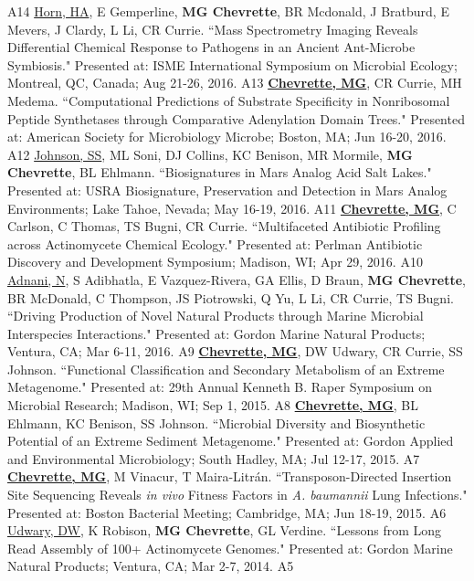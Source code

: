 \begin{cvpubs}
    {A14} %
  \cvpub
    {\underline{Horn, HA}, E Gemperline, \textbf{MG Chevrette}, BR Mcdonald, J Bratburd, E Mevers, J Clardy, L Li, CR Currie. ``Mass Spectrometry Imaging Reveals Differential Chemical Response to Pathogens in an Ancient Ant-Microbe Symbiosis." Presented at: ISME International Symposium on Microbial Ecology; Montreal, QC, Canada; Aug 21-26, 2016.} %
    {A13} %
  \cvpub
    {\textbf{\underline{Chevrette, MG}}, CR Currie, MH Medema.  ``Computational Predictions of Substrate Specificity in Nonribosomal Peptide Synthetases through Comparative Adenylation Domain Trees." Presented at: American Society for Microbiology Microbe; Boston, MA; Jun 16-20, 2016.} %
    {A12} %
  \cvpub
    {\underline{Johnson, SS}, ML Soni, DJ Collins, KC Benison, MR Mormile, \textbf{MG Chevrette}, BL Ehlmann. ``Biosignatures in Mars Analog Acid Salt Lakes." Presented at: USRA Biosignature, Preservation and Detection in Mars Analog Environments; Lake Tahoe, Nevada; May 16-19, 2016.} %
    {A11} %
  \cvpub
    {\textbf{\underline{Chevrette, MG}}, C Carlson, C Thomas, TS Bugni, CR Currie. ``Multifaceted Antibiotic Profiling across Actinomycete Chemical Ecology." Presented at: Perlman Antibiotic Discovery and Development Symposium; Madison, WI; Apr 29, 2016.} %
    {A10} %
  \cvpub
    {\underline{Adnani, N}, S Adibhatla, E Vazquez-Rivera, GA Ellis, D Braun, \textbf{MG Chevrette}, BR McDonald, C Thompson, JS Piotrowski, Q Yu, L Li, CR Currie, TS Bugni. ``Driving Production of Novel Natural Products through Marine Microbial Interspecies Interactions." Presented at: Gordon Marine Natural Products; Ventura, CA; Mar 6-11, 2016.} %
    {A9} %
  \cvpub
    {\textbf{\underline{Chevrette, MG}}, DW Udwary, CR Currie, SS Johnson. ``Functional Classification and Secondary Metabolism of an Extreme Metagenome." Presented at: 29th Annual Kenneth B. Raper Symposium on Microbial Research; Madison, WI; Sep 1, 2015.} %
    {A8} %
  \cvpub
    {\textbf{\underline{Chevrette, MG}}, BL Ehlmann, KC Benison, SS Johnson. ``Microbial Diversity and Biosynthetic Potential of an Extreme Sediment Metagenome." Presented at: Gordon Applied and Environmental Microbiology; South Hadley, MA; Jul 12-17, 2015.} %
    {A7} %
  \cvpub
    {\textbf{\underline{Chevrette, MG}}, M Vinacur, T Maira-Litr\'{a}n. ``Transposon-Directed Insertion Site Sequencing Reveals \textit{in vivo} Fitness Factors in \textit{A. baumannii} Lung Infections." Presented at: Boston Bacterial Meeting; Cambridge, MA; Jun 18-19, 2015.} %
    {A6} %
  \cvpub
    {\underline{Udwary, DW}, K Robison, \textbf{MG Chevrette}, GL Verdine. ``Lessons from Long Read Assembly of 100+ Actinomycete Genomes." Presented at: Gordon Marine Natural Products; Ventura, CA; Mar 2-7, 2014.} %
    {A5} %
\end{cvpubs}
